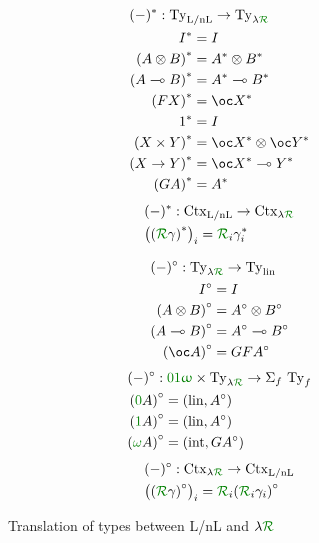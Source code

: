 \begin{figure}
  \centering
  \begin{subfigure}{.49\linewidth}
    \centering
    \begin{align*}
      &(-)^* : \mathrm{Ty}_\lnl \to \mathrm{Ty}_{\name} \\
      &\begin{aligned}
        I^* &= I \\
        \plr{A \otimes B}^* &= A^* \otimes B^* \\
        \plr{A \multimap B}^* &= A^* \multimap B^* \\
        \plr{FX}^* &= \oc X^* \\
        1^* &= I \\
        \plr{X \times Y}^* &= \oc X^* \otimes \oc Y^* \\
        \plr{X \to Y}^* &= \oc X^* \multimap Y^* \\
        \plr{GA}^* &= A^*
      \end{aligned}
    \end{align*}
    \begin{align*}
      &(-)^* : \mathrm{Ctx}_\lnl \to \mathrm{Ctx}_{\name} \\
      &\plr{\plr{\grR\gamma}^*}_i = \grR_i\gamma_i^*
    \end{align*}
  \end{subfigure}
  \begin{subfigure}{.49\linewidth}
    \centering
    \begin{align*}
      &(-)^\circ : \mathrm{Ty}_{\name} \to \mathrm{Ty}_{\lin} \\
      &\begin{aligned}
        I^\circ &= I \\
        \plr{A \otimes B}^\circ &= A^\circ \otimes B^\circ \\
        \plr{A \multimap B}^\circ &= A^\circ \multimap B^\circ \\
        \plr{\oc A}^\circ &= GFA^\circ
      \end{aligned}
    \end{align*}
    \begin{align*}
      &(-)^\circ : \oiw \times \mathrm{Ty}_{\name} \to \Sigma_f~\mathrm{Ty}_f \\
      &\begin{aligned}
        \plr{\gr0A}^\circ &= \plr{\lin, A^\circ} \\
        \plr{\gr1A}^\circ &= \plr{\lin, A^\circ} \\
        \plr{\gr\omega A}^\circ &= \plr{\intu, GA^\circ}
      \end{aligned}
    \end{align*}
    \begin{align*}
      &(-)^\circ : \mathrm{Ctx}_{\name} \to \mathrm{Ctx}_\lnl \\
      &\plr{\plr{\grR\gamma}^\circ}_i = \grR_i\plr{\grR_i\gamma_i}^\circ
    \end{align*}
  \end{subfigure}
  \caption{Translation of types between L/nL and $\name$}
  \label{fig:lnl-lr-types}
\end{figure}

